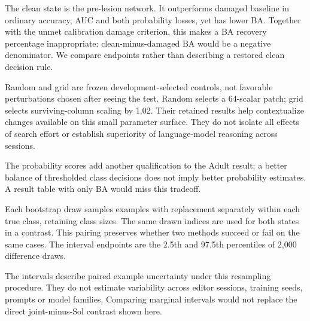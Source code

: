 The clean state is the pre-lesion network. It outperforms damaged baseline in ordinary accuracy, AUC and both probability losses, yet has lower BA. Together with the unmet calibration damage criterion, this makes a BA recovery percentage inappropriate: clean-minus-damaged BA would be a negative denominator. We compare endpoints rather than describing a restored clean decision rule.

Random and grid are frozen development-selected controls, not favorable perturbations chosen after seeing the test. Random selects a 64-scalar patch; grid selects surviving-column scaling by 1.02. Their retained results help contextualize changes available on this small parameter surface. They do not isolate all effects of search effort or establish superiority of language-model reasoning across sessions.

The probability scores add another qualification to the Adult result: a better balance of thresholded class decisions does not imply better probability estimates. A result table with only BA would miss this tradeoff.



Each bootstrap draw samples examples with replacement separately within each true class, retaining class sizes. The same drawn indices are used for both states in a contrast. This pairing preserves whether two methods succeed or fail on the same cases. The interval endpoints are the 2.5th and 97.5th percentiles of 2,000 difference draws.

The intervals describe paired example uncertainty under this resampling procedure. They do not estimate variability across editor sessions, training seeds, prompts or model families. Comparing marginal intervals would not replace the direct joint-minus-Sol contrast shown here.

